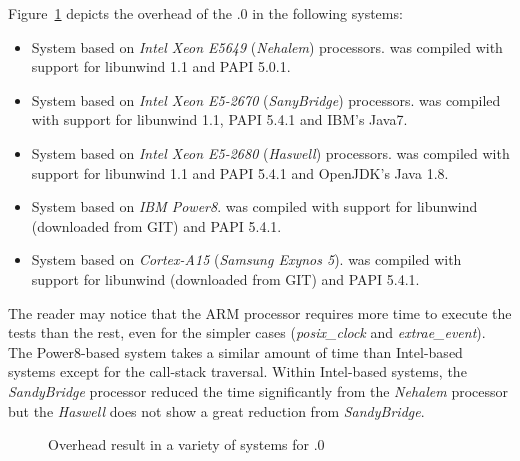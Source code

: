 Figure~\ref{fig:Overhead_Extrae_3_3_0} depicts the overhead of the .0 in the following systems:
\begin{itemize}
\item System based on \textit{Intel Xeon E5649} (\textit{Nehalem}) processors. \TRACE was compiled with support for libunwind 1.1 and PAPI 5.0.1.
\item System based on \textit{Intel Xeon E5-2670} (\textit{SanyBridge}) processors. \TRACE was compiled with support for libunwind 1.1, PAPI 5.4.1 and IBM's Java7.
\item System based on \textit{Intel Xeon E5-2680} (\textit{Haswell}) processors. \TRACE was compiled with support for libunwind 1.1 and PAPI 5.4.1 and OpenJDK's Java 1.8.
\item System based on \textit{IBM Power8}. \TRACE was compiled with support for libunwind (downloaded from GIT) and PAPI 5.4.1.
\item System based on \textit{Cortex-A15} (\textit{Samsung Exynos 5}). \TRACE was compiled with support for libunwind (downloaded from GIT) and PAPI 5.4.1.
\end{itemize}
The reader may notice that the ARM processor requires more time to execute the tests than the rest, even for the simpler cases (\textit{posix\_clock} and \textit{extrae\_event}). The Power8-based system takes a similar amount of time than Intel-based systems except for the call-stack traversal. Within Intel-based systems, the \textit{SandyBridge} processor reduced the time significantly from the \textit{Nehalem} processor but the \textit{Haswell} does not show a great reduction from \textit{SandyBridge}.

\begin{figure}
\centering
\label{fig:Overhead_Extrae_3_3_0}
\caption{Overhead result in a variety of systems for .0}
\end{figure}

